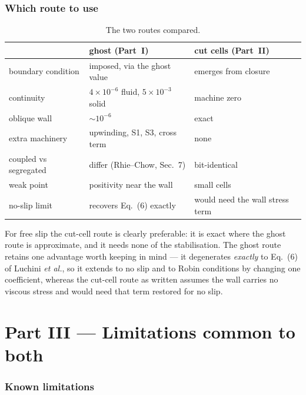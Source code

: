 \documentclass[11pt,a4paper]{article}
\begin{document}
\section{Which route to use}

\begin{table}[h]\centering
\caption{The two routes compared.}
\label{tab:routes}
\begin{tabular}{lll}
\toprule
 & ghost (Part~I) & cut cells (Part~II)\\
\midrule
boundary condition   & imposed, via the ghost value      & emerges from closure\\
continuity           & $4\times10^{-6}$ fluid, $5\times10^{-3}$ solid & machine zero\\
oblique wall         & $\sim10^{-6}$                     & exact\\
extra machinery      & upwinding, S1, S3, cross term     & none\\
coupled vs segregated& differ (Rhie--Chow, Sec.~7)       & bit-identical\\
weak point           & positivity near the wall          & small cells\\
no-slip limit        & recovers Eq.~(6) exactly          & would need the wall stress term\\
\bottomrule
\end{tabular}
\end{table}

For free slip the cut-cell route is clearly preferable: it is exact where the ghost route is
approximate, and it needs none of the stabilisation. The ghost route retains one advantage
worth keeping in mind --- it degenerates \emph{exactly} to Eq.~(6) of Luchini \emph{et al.},
so it extends to no slip and to Robin conditions by changing one coefficient, whereas the
cut-cell route as written assumes the wall carries no viscous stress and would need that term
restored for no slip.

\part*{Part III --- Limitations common to both}

\section{Known limitations}
\end{document}
